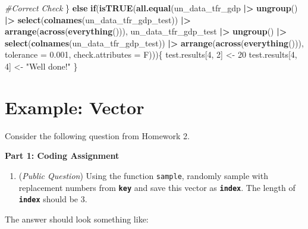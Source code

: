 \documentclass[
  12pt,
]{book}
\newenvironment{Shaded}{\begin{snugshade}}{\end{snugshade}}
\newcommand{\AttributeTok}[1]{\textcolor[rgb]{0.13,0.29,0.53}{#1}}
\newcommand{\CommentTok}[1]{\textcolor[rgb]{0.56,0.35,0.01}{\textit{#1}}}
\newcommand{\ControlFlowTok}[1]{\textcolor[rgb]{0.13,0.29,0.53}{\textbf{#1}}}
\newcommand{\DecValTok}[1]{\textcolor[rgb]{0.00,0.00,0.81}{#1}}
\newcommand{\FloatTok}[1]{\textcolor[rgb]{0.00,0.00,0.81}{#1}}
\newcommand{\FunctionTok}[1]{\textcolor[rgb]{0.13,0.29,0.53}{\textbf{#1}}}
\newcommand{\NormalTok}[1]{#1}
\newcommand{\OtherTok}[1]{\textcolor[rgb]{0.56,0.35,0.01}{#1}}
\newcommand{\SpecialCharTok}[1]{\textcolor[rgb]{0.81,0.36,0.00}{\textbf{#1}}}
\newcommand{\StringTok}[1]{\textcolor[rgb]{0.31,0.60,0.02}{#1}}
\providecommand{\tightlist}{%
  \setlength{\itemsep}{0pt}\setlength{\parskip}{0pt}}
\begin{document}
\begin{Shaded}
\begin{Highlighting}[]
\CommentTok{\#Correct Check }
\NormalTok{\} }\ControlFlowTok{else} \ControlFlowTok{if}\NormalTok{(}\FunctionTok{isTRUE}\NormalTok{(}\FunctionTok{all.equal}\NormalTok{(un\_data\_tfr\_gdp }\SpecialCharTok{|\textgreater{}} \FunctionTok{ungroup}\NormalTok{() }\SpecialCharTok{|\textgreater{}}
                           \FunctionTok{select}\NormalTok{(}\FunctionTok{colnames}\NormalTok{(un\_data\_tfr\_gdp\_test)) }\SpecialCharTok{|\textgreater{}}
                           \FunctionTok{arrange}\NormalTok{(}\FunctionTok{across}\NormalTok{(}\FunctionTok{everything}\NormalTok{())),}
\NormalTok{                           un\_data\_tfr\_gdp\_test }\SpecialCharTok{|\textgreater{}} \FunctionTok{ungroup}\NormalTok{() }\SpecialCharTok{|\textgreater{}} 
                           \FunctionTok{select}\NormalTok{(}\FunctionTok{colnames}\NormalTok{(un\_data\_tfr\_gdp\_test)) }\SpecialCharTok{|\textgreater{}}
                           \FunctionTok{arrange}\NormalTok{(}\FunctionTok{across}\NormalTok{(}\FunctionTok{everything}\NormalTok{())),}
                           \AttributeTok{tolerance =} \FloatTok{0.001}\NormalTok{,}
                           \AttributeTok{check.attributes =}\NormalTok{ F)))\{}
\NormalTok{  test.results[}\DecValTok{4}\NormalTok{, }\DecValTok{2}\NormalTok{] }\OtherTok{\textless{}{-}} \DecValTok{20}
\NormalTok{  test.results[}\DecValTok{4}\NormalTok{, }\DecValTok{4}\NormalTok{] }\OtherTok{\textless{}{-}} \StringTok{"Well done!"}
\NormalTok{\}}
\end{Highlighting}
\end{Shaded}

\section{Example: Vector}\label{example-vector}

Consider the following question from Homework 2.

\textbf{Part 1: Coding Assignment}

\begin{enumerate}
\def\labelenumi{\arabic{enumi}.}
\setcounter{enumi}{1}
\tightlist
\item
  (\emph{Public Question}) Using the function \texttt{sample}, randomly sample with replacement numbers from \textbf{\texttt{key}} and save this vector as \textbf{\texttt{index}}. The length of \textbf{\texttt{index}} should be 3.
\end{enumerate}

The answer should look something like:
\end{document}
